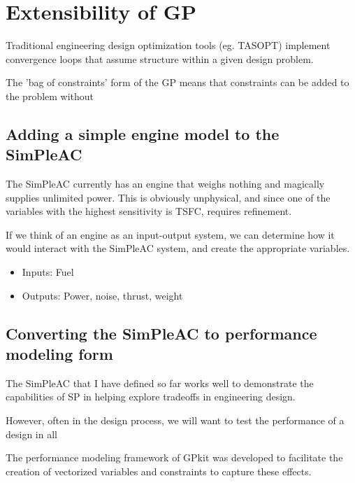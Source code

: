 \chapter{Extensibility of \gls{GP}}

Traditional engineering design optimization tools (eg. TASOPT) implement convergence loops that assume structure within a given design problem. 

The 'bag of constraints' form of the GP means that constraints can be added to the problem without 

\section{Adding a simple engine model to the SimPleAC}

The SimPleAC currently has an engine that weighs nothing and magically supplies unlimited power. This is obviously unphysical, and since one of the variables with the highest sensitivity is TSFC, requires refinement. 

If we think of an engine as an input-output system, we can determine how it would interact with the SimPleAC system, and create the appropriate variables. 

\begin{itemize}
\item Inputs: Fuel
\item Outputs: Power, noise, thrust, weight
\end{itemize}

\section{Converting the SimPleAC to performance modeling form}

The SimPleAC that I have defined so far works well to demonstrate the capabilities of \gls{SP} in helping explore tradeoffs in engineering design. 

However, often in the design process, we will want to test the performance of a design in all

The performance modeling framework of GPkit was developed to facilitate the creation of vectorized variables and constraints to capture these effects. 